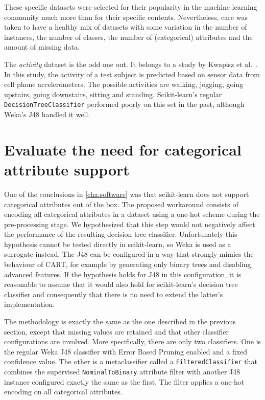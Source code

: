 These specific datasets were selected for their popularity in the machine learning community much more than for their specific contents. Nevertheless, care was taken to have a healthy mix of datasets with some variation in the number of instances, the number of classes, the number of (categorical) attributes and the amount of missing data.

The \emph{activity} dataset is the odd one out. It belongs to a study by Kwapisz et al.~\cite{problematic_dataset}. In this study, the activity of a test subject is predicted based on sensor data from cell phone accelerometers. The possible activities are walking, jogging, going upstairs, going downstairs, sitting and standing. Scikit-learn's regular \texttt{DecisionTreeClassifier} performed poorly on this set in the past, although Weka's J48 handled it well.

\section{Evaluate the need for categorical attribute support}
One of the conclusions in \autoref{cha:software} was that scikit-learn does not support categorical attributes out of the box. The proposed workaround consists of encoding all categorical attributes in a dataset using a one-hot scheme during the pre-processing stage. We hypothesized that this step would not negatively affect the performance of the resulting decision tree classifier. Unfortunately this hypothesis cannot be tested directly in scikit-learn, so Weka is used as a surrogate instead. The J48 can be configured in a way that strongly mimics the behaviour of CART, for example by generating only binary trees and disabling advanced features. If the hypothesis holds for J48 in this configuration, it is reasonable to assume that it would also hold for scikit-learn's decision tree classifier and consequently that there is no need to extend the latter's implementation.

The methodology is exactly the same as the one described in the previous section, except that missing values are retained and that other classifier configurations are involved. More specifically, there are only two classifiers. One is the regular Weka J48 classifier with Error Based Pruning enabled and a fixed confidence value. The other is a metaclassifier called a \texttt{FilteredClassifier} that combines the supervised \texttt{NominalToBinary} attribute filter with another J48 instance configured exactly the same as the first. The filter applies a one-hot encoding on all categorical attributes.

